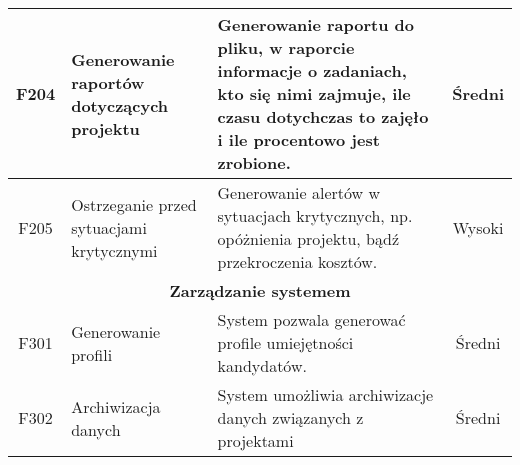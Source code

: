 \begin{adjustwidth}{2em}{0pt}
\begin{tabularx}{\textwidth}{|c|X|X|c|}
\hline 
F204 & Generowanie raportów dotyczących projektu & Generowanie raportu do pliku, w raporcie informacje o zadaniach, kto się nimi zajmuje,  ile czasu dotychczas to zajęło i ile procentowo jest zrobione. & Średni \\
\hline 
F205 & Ostrzeganie przed sytuacjami krytycznymi & Generowanie alertów w sytuacjach krytycznych, np. opóżnienia projektu, bądź przekroczenia kosztów. & Wysoki \\
\hline 
\multicolumn{4}{|c|}{\textbf{Zarządzanie systemem}} \\
\hline 
F301 & Generowanie profili & System pozwala generować profile umiejętności kandydatów.  & Średni \\ 
\hline
F302 & Archiwizacja danych & System umożliwia archiwizacje danych związanych z projektami & Średni \\ 
\hline

\end{tabularx}

\end{adjustwidth}


